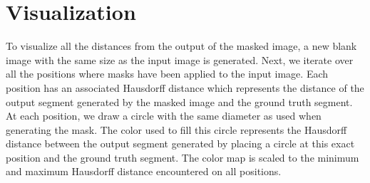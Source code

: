 \section{Visualization}

To visualize all the distances from the output of the masked image, a new blank image with the same size as the input image is generated. Next, we iterate over all the positions where masks have been applied to the input image. Each position has an associated Hausdorff distance which represents the distance of the output segment generated by the masked image and the ground truth segment.
At each position, we draw a circle with the same diameter as used when generating the mask. The color used to fill this circle represents the Hausdorff distance between the output segment generated by placing a circle at this exact position and the ground truth segment. The color map is scaled to the minimum and maximum Hausdorff distance encountered on all positions.

